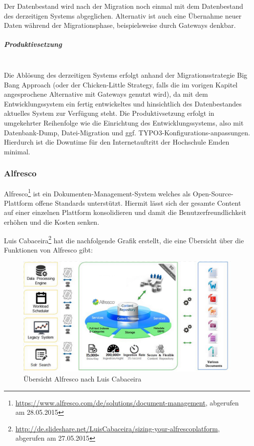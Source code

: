 Der Datenbestand wird nach der Migration noch einmal mit dem Datenbestand des derzeitigen Systems abgeglichen. Alternativ ist auch eine Übernahme neuer Daten während der Migrationsphase, beispielsweise durch Gateways denkbar. 

\subparagraph{Produktivsetzung}\mbox{}\\
Die Ablösung des derzeitigen Systems erfolgt anhand der Migrationsstrategie Big Bang Approach (oder der Chicken-Little Strategy, falls die im vorigen Kapitel angesprochene Alternative mit Gateways genutzt wird), da mit dem Entwicklungssystem ein fertig entwickeltes und hinsichtlich des Datenbestandes aktuelles System zur Verfügung steht. Die Produktivsetzung erfolgt in umgekehrter Reihenfolge wie die Einrichtung des Entwicklungssystems, also mit Datenbank-Dump, Datei-Migration und ggf. TYPO3-Konfigurations-anpassungen. Hierdurch ist die Downtime für den Internetauftritt der Hochschule Emden minimal.

\subsubsection{Alfresco}
\label{subsubsection_migration_alfresco}
Alfresco\footnote{\url{https://www.alfresco.com/de/solutions/document-management}, abgerufen am 28.05.2015} ist ein Dokumenten-Management-System welches als Open-Source-Plattform offene Standards unterstützt. Hiermit lässt sich der gesamte Content auf einer einzelnen Plattform konsolidieren und damit die Benutzerfreundlichkeit erhöhen und die Kosten senken.

Luis Cabaceira\footnote{\url{http://de.slideshare.net/LuisCabaceira/sizing-your-alfrescoplatform}, abgerufen am 27.05.2015} hat die nachfolgende Grafik erstellt, die eine Übersicht über die Funktionen von Alfresco gibt:

\begin{figure}[h!]
	\centering
	\includegraphics[width=\textwidth]
	{kapitel/gruppe4_1/bilder/uebersicht_alfresco}
	\caption{Übersicht Alfresco nach Luis Cabaceira}
	\label{fig_uebersicht_alfresco}
\end{figure}


